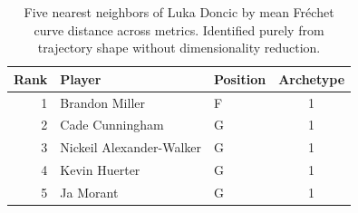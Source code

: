 \begin{table}[htbp]
  \centering\small
  \begin{tabular}{rllc}
    \toprule
    Rank & Player & Position & Archetype \\
    \midrule
    1 & Brandon Miller & F & 1 \\
    2 & Cade Cunningham & G & 1 \\
    3 & Nickeil Alexander-Walker & G & 1 \\
    4 & Kevin Huerter & G & 1 \\
    5 & Ja Morant & G & 1 \\
    \bottomrule
  \end{tabular}
  \caption{Five nearest neighbors of Luka Doncic by mean Fr\'{e}chet curve distance across metrics. Identified purely from trajectory shape without dimensionality reduction.}
  \label{tab:Luka_Doncic_frechet_curve_neighbors}
\end{table}

